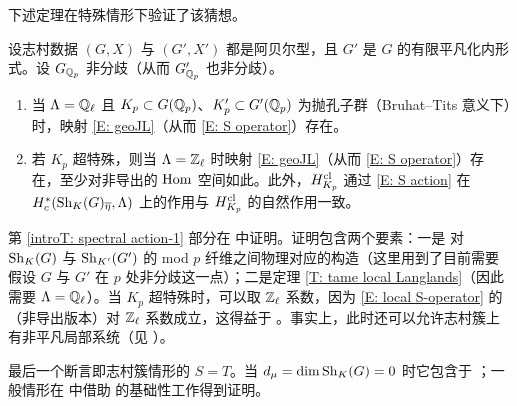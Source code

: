 下述定理在特殊情形下验证了该猜想。

\begin{thm}
\label{introT: spectral action}
设志村数据 $(G,X)$ 与 $(G',X')$ 都是阿贝尔型，且 $G'$ 是 $G$ 的有限平凡化内形式。设 $G_{{\mathbb Q}_p}$ 非分歧（从而 $G'_{{\mathbb Q}_p}$ 也非分歧）。
\begin{enumerate}
\item\label{introT: spectral action-1} 当 ${\Lambda}={\mathbb Q}_\ell$ 且 $K_p\subset G({\mathbb Q}_p)$、$K'_p\subset G'({\mathbb Q}_p)$ 为抛孔子群（Bruhat--Tits 意义下）时，映射 \eqref{E: geoJL}（从而 \eqref{E: S operator}）存在。
\item\label{introT: spectral action-2} 若 $K_p$ 超特殊，则当 ${\Lambda}={\mathbb Z}_\ell$ 时映射 \eqref{E: geoJL}（从而 \eqref{E: S operator}）存在，至少对非导出的 ${\operatorname{Hom}}$ 空间如此。此外，$H_{K_p}^{{\operatorname{cl}}}$ 通过 \eqref{E: S action} 在 $H_c^*({\operatorname{Sh}}_{K}(G)_{\overline\eta},{\Lambda})$ 上的作用与 $H_{K_p}^{{\operatorname{cl}}}$ 的自然作用一致。
\end{enumerate}
\end{thm}

第 \eqref{introT: spectral action-1} 部分在 \cite{Xiao-Zhu-Cycle, Hemo-Zhu-Unipotent} 中证明。证明包含两个要素：一是 \cite{Xiao-Zhu-Cycle} 对 ${\operatorname{Sh}}_K(G)$ 与 ${\operatorname{Sh}}_{K'}(G')$ 的 mod $p$ 纤维之间物理对应的构造（这里用到了目前需要假设 $G$ 与 $G'$ 在 $p$ 处非分歧这一点）；二是定理 \ref{T: tame local Langlands}（因此需要 ${\Lambda}={\mathbb Q}_\ell$）。当 $K_p$ 超特殊时，可以取 ${\mathbb Z}_\ell$ 系数，因为 \eqref{E: local S-operator} 的（非导出版本）对 ${\mathbb Z}_\ell$ 系数成立，这得益于 \cite{Yu-Jacquet-Langlands-Higher-Weights}。事实上，此时还可以允许志村簇上有非平凡局部系统（见 \cite{Yu-Jacquet-Langlands-Higher-Weights}）。

最后一个断言即志村簇情形的 $S=T$。当 $d_{\mu}=\dim{\operatorname{Sh}}_K(G)=0$ 时它包含于 \cite{Xiao-Zhu-Cycle}；一般情形在 \cite{Wu-S=T, Zhu-S=T} 中借助 \cite{Scholze-Berkeley, Fargues-Scholze-Geometrization} 的基础性工作得到证明。
